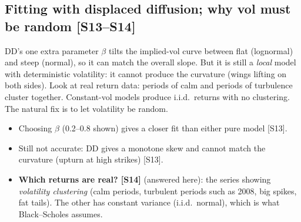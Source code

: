 \documentclass[10pt]{article}
\begin{document}
\subsection{Fitting with displaced diffusion; why vol must be random [S13--S14]}
\begin{idea}
DD's one extra parameter $\beta$ tilts the implied-vol curve between flat (lognormal) and steep (normal), so it can match the overall slope. But it is still a \emph{local} model with deterministic volatility: it cannot produce the curvature (wings lifting on both sides). Look at real return data: periods of calm and periods of turbulence cluster together. Constant-vol models produce i.i.d.\ returns with no clustering. The natural fix is to let volatility be random.
\end{idea}
\begin{itemize}
\item Choosing $\beta$ (0.2--0.8 shown) gives a closer fit than either pure model [S13].
\item Still not accurate: DD gives a monotone skew and cannot match the curvature (upturn at high strikes) [S13].
\item \textbf{Which returns are real? [S14]} (answered here): the series showing \emph{volatility clustering} (calm periods, turbulent periods such as 2008, big spikes, fat tails). The other has constant variance (i.i.d.\ normal), which is what Black--Scholes assumes.
\end{itemize}
\end{document}
